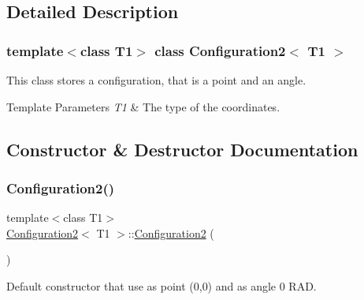 \subsection{Detailed Description}
\subsubsection*{template$<$class T1$>$\newline
class Configuration2$<$ T1 $>$}

This class stores a configuration, that is a point and an angle. 


\begin{DoxyTemplParams}{Template Parameters}
{\em T1} & The type of the coordinates. \\
\hline
\end{DoxyTemplParams}


\subsection{Constructor \& Destructor Documentation}
\mbox{\label{class_configuration2_a6fc5a5a723da700b6a869db09ec5614f}} 
\subsubsection{\texorpdfstring{Configuration2()}{Configuration2()}\hspace{0.1cm}{\footnotesize\ttfamily [1/3]}}
{\footnotesize\ttfamily template$<$class T1$>$ \\
\mbox{\hyperlink{class_configuration2}{Configuration2}}$<$ T1 $>$\+::\mbox{\hyperlink{class_configuration2}{Configuration2}} (\begin{DoxyParamCaption}{ }\end{DoxyParamCaption})\hspace{0.3cm}{\ttfamily [inline]}}



Default constructor that use as point (0,0) and as angle 0 R\+AD. 

\mbox{\label{class_configuration2_a09e73e9fe2ae9a67a037a0b3d0619047}} 
